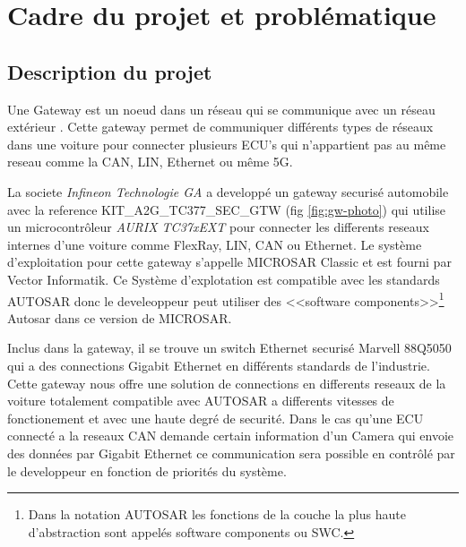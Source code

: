 \section{Cadre du projet et probl\'ematique}

\subsection{Description du projet}

Une Gateway est un noeud dans un réseau qui se communique avec un réseau extérieur \cite{gateway-definition}. Cette gateway permet de communiquer différents types de réseaux dans une voiture pour connecter plusieurs ECU's qui n'appartient pas au même reseau comme la CAN, LIN, Ethernet ou m\^eme 5G. 

La societe \textit{Infineon Technologie GA} a developp\'e un gateway securis\'e automobile avec la reference KIT\_A2G\_TC377\_SEC\_GTW \cite{gateway} (fig \ref{fig:gw-photo}) qui utilise un microcontr\^oleur \textit{AURIX TC37xEXT} pour connecter les differents reseaux internes d'une voiture comme FlexRay, LIN, CAN ou Ethernet. Le syst\`eme d'exploitation pour cette gateway s'appelle MICROSAR Classic \cite{vector.microsar} et est fourni par Vector Informatik. Ce Syst\`eme d'explotation est compatible avec les standards AUTOSAR\cite{autosar-intro} donc le develeoppeur peut utiliser des <<software components>>\footnote{Dans la notation AUTOSAR les fonctions de la couche la plus haute d'abstraction sont appel\'es software components ou SWC\cite{swc_man}.} Autosar dans ce version de MICROSAR.

Inclus dans la gateway, il se trouve un switch Ethernet securis\'e Marvell 88Q5050 qui a des connections Gigabit Ethernet en différents standards de l'industrie. Cette gateway nous offre une solution de connections en differents reseaux de la voiture totalement compatible avec AUTOSAR a differents vitesses de fonctionement et avec une haute degré de securit\'e. Dans le cas qu'une ECU connect\'e a la reseaux CAN demande certain information d'un Camera qui envoie des donn\'ees par Gigabit Ethernet ce communication sera possible en contr\^ol\'e par le developpeur en fonction de priorit\'es du syst\`eme.


